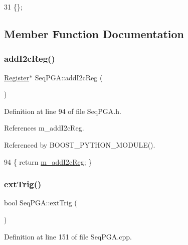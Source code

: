 \begin{DoxyCode}
31 \{\}; 
\end{DoxyCode}


\subsection{Member Function Documentation}
\mbox{\label{classSeqPGA_a80eec67d433c12f8fcdf1ad73c6b8f59}} 
\subsubsection{\texorpdfstring{add\+I2c\+Reg()}{addI2cReg()}}
{\footnotesize\ttfamily \hyperlink{classRegister}{Register}$\ast$ Seq\+P\+G\+A\+::add\+I2c\+Reg (\begin{DoxyParamCaption}{ }\end{DoxyParamCaption})\hspace{0.3cm}{\ttfamily [inline]}}



Definition at line 94 of file Seq\+P\+G\+A.\+h.



References m\+\_\+add\+I2c\+Reg.



Referenced by B\+O\+O\+S\+T\+\_\+\+P\+Y\+T\+H\+O\+N\+\_\+\+M\+O\+D\+U\+L\+E().


\begin{DoxyCode}
94 \{ \textcolor{keywordflow}{return} \hyperlink{classSeqPGA_ac3a6aad3fec65ceb78528b6d20deeb3f}{m\_addI2cReg};    \}
\end{DoxyCode}
\mbox{\label{classSeqPGA_ae2e0917c379649d106539cc3b8b9ca3c}} 
\subsubsection{\texorpdfstring{ext\+Trig()}{extTrig()}}
{\footnotesize\ttfamily bool Seq\+P\+G\+A\+::ext\+Trig (\begin{DoxyParamCaption}{ }\end{DoxyParamCaption})}



Definition at line 151 of file Seq\+P\+G\+A.\+cpp.



